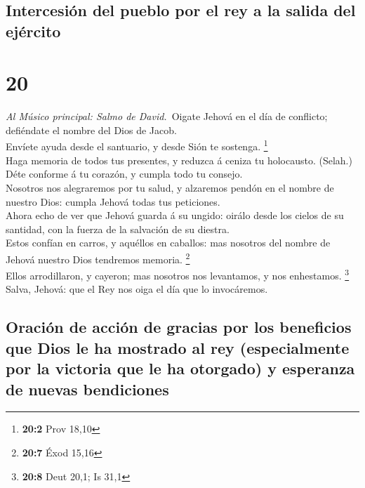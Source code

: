 \hypertarget{intercesiuxf3n-del-pueblo-por-el-rey-a-la-salida-del-ejuxe9rcito}{%
\subsection{Intercesión del pueblo por el rey a la salida del
ejército}\label{intercesiuxf3n-del-pueblo-por-el-rey-a-la-salida-del-ejuxe9rcito}}

\hypertarget{section-19}{%
\section{20}\label{section-19}}

 \emph{Al Músico principal: Salmo de David.}~Oigate Jehová
en el día de conflicto; defiéndate el nombre del Dios de Jacob.\\
 Envíete ayuda desde el santuario, y desde Sión te sostenga.
\footnote{\textbf{20:2} Prov 18,10}\\
 Haga memoria de todos tus presentes, y reduzca á ceniza tu
holocausto. (Selah.)\\
 Déte conforme á tu corazón, y cumpla todo tu consejo.\\
 Nosotros nos alegraremos por tu salud, y alzaremos pendón
en el nombre de nuestro Dios: cumpla Jehová todas tus peticiones.\\
 Ahora echo de ver que Jehová guarda á su ungido: oirálo
desde los cielos de su santidad, con la fuerza de la salvación de su
diestra.\\
 Estos confían en carros, y aquéllos en caballos: mas
nosotros del nombre de Jehová nuestro Dios tendremos memoria.
\footnote{\textbf{20:7} Éxod 15,16}\\
 Ellos arrodillaron, y cayeron; mas nosotros nos levantamos,
y nos enhestamos. \footnote{\textbf{20:8} Deut 20,1; Is 31,1}\\
 Salva, Jehová: que el Rey nos oiga el día que lo
invocáremos.

\hypertarget{oraciuxf3n-de-acciuxf3n-de-gracias-por-los-beneficios-que-dios-le-ha-mostrado-al-rey-especialmente-por-la-victoria-que-le-ha-otorgado-y-esperanza-de-nuevas-bendiciones}{%
\subsection{Oración de acción de gracias por los beneficios que Dios le
ha mostrado al rey (especialmente por la victoria que le ha otorgado) y
esperanza de nuevas
bendiciones}\label{oraciuxf3n-de-acciuxf3n-de-gracias-por-los-beneficios-que-dios-le-ha-mostrado-al-rey-especialmente-por-la-victoria-que-le-ha-otorgado-y-esperanza-de-nuevas-bendiciones}}

